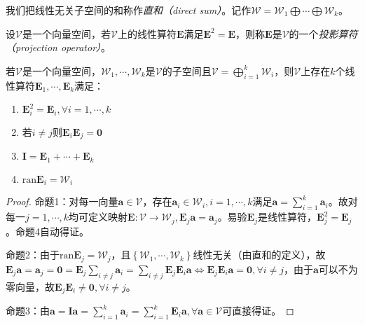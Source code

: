 \documentclass[main.tex]{subfiles}
\begin{document}
我们把线性无关子空间的和称作\emph{直和（direct sum）}。记作$\mathcal{W}=\mathcal{W}_1\bigoplus\cdots\bigoplus\mathcal{W}_k$。

\begin{definition}[投影算符]\label{def:A.3}
    设$\mathcal{V}$是一个向量空间，若$\mathcal{V}$上的线性算符$\mathbf{E}$满足$\mathbf{E}^2=\mathbf{E}$，则称$\mathbf{E}$是$\mathcal{V}$的一个\emph{投影算符（projection operator）}。
\end{definition}

\begin{theorem}\label{thm:A.3}
    若$\mathcal{V}$是一个向量空间，$\mathcal{W}_1,\cdots,\mathcal{W}_k$是$\mathcal{V}$的子空间且$\mathcal{V}=\bigoplus_{i=1}^k\mathcal{W}_i$，则$\mathcal{V}$上存在$k$个线性算符$\mathbf{E}_1,\cdots,\mathbf{E}_k$满足：
    \begin{enumerate}
        \item $\mathbf{E}_i^2=\mathbf{E}_i,\forall i=1,\cdots,k$
        \item 若$i\neq j$则$\mathbf{E}_i\mathbf{E}_j=\mathbf{0}$
        \item $\mathbf{I}=\mathbf{E}_1+\cdots+\mathbf{E}_k$
        \item $\mathrm{ran}\mathbf{E}_i=\mathcal{W}_i$
    \end{enumerate}
\end{theorem}
\begin{proof}
    命题1：对每一向量$\mathbf{a}\in\mathcal{V}$，存在$\mathbf{a}_i\in\mathcal{W}_i,i=1,\cdots,k$满足$\mathbf{a}=\sum_{i=1}^k\mathbf{a}_i$。故对每一$j=1,\cdots,k$均可定义映射$\mathbf{E}:\mathcal{V}\rightarrow\mathcal{W}_j,\mathbf{E}_j\mathbf{a}=\mathbf{a}_j$。易验$\mathbf{E}_j$是线性算符，$\mathbf{E}_j^2=\mathbf{E}_j$。命题4自动得证。

    命题2：由于$\mathrm{ran}\mathbf{E}_j=\mathcal{W}_j$，且$\left\{\mathcal{W}_1,\cdots,\mathcal{W}_k\right\}$线性无关（由直和的定义），故$\mathbf{E}_j\mathbf{a}=\mathbf{a}_j=\mathbf{0}=\mathbf{E}_j\sum_{i\neq j}\mathbf{a}_i=\sum_{i\neq j}\mathbf{E}_j\mathbf{E}_i\mathbf{a}\Leftrightarrow\mathbf{E}_j\mathbf{E}_i\mathbf{a}=\mathbf{0},\forall i\neq j$，由于$\mathbf{a}$可以不为零向量，故$\mathbf{E}_j\mathbf{E}_i\neq\mathbf{0},\forall  i\neq j$。

    命题3：由$\mathbf{a}=\mathbf{Ia}=\sum_{i=1}^k\mathbf{a}_i=\sum_{i=1}^k\mathbf{E}_i\mathbf{a},\forall\mathbf{a}\in\mathcal{V}$可直接得证。
\end{proof}


\end{document}
